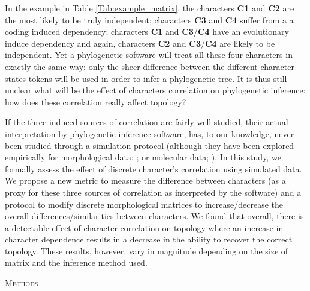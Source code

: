 \documentclass[12pt,letterpaper]{article}
\renewcommand{\section}[1]{%
\bigskip
\begin{center}
\begin{Large}
\normalfont\scshape #1
\medskip
\end{Large}
\end{center}}
\begin{document}
In the example in Table \ref{Tab:example_matrix}, the characters \textbf{C1} and \textbf{C2} are the most likely to be truly independent; characters \textbf{C3} and \textbf{C4} suffer from a a coding induced dependency; characters \textbf{C1} and \textbf{C3}/\textbf{C4} have an evolutionary induce dependency and again, characters \textbf{C2} and \textbf{C3}/\textbf{C4} are likely to be independent.
Yet a phylogenetic software will treat all these four characters in exactly the same way: only the sheer difference between the different character states tokens will be used in order to infer a phylogenetic tree.
It is thus still unclear what will be the effect of characters correlation on phylogenetic inference: how does these correlation really affect topology?

If the three induced sources of correlation are fairly well studied, their actual interpretation by phylogenetic inference software, has, to our knowledge, never been studied through a simulation protocol (although they have been explored empirically for morphological data; \citealt{Davalos01072014}; or molecular data; \citealt{ZouConvergence}).
In this study, we formally assess the effect of discrete character's correlation using simulated data.
We propose a new metric to measure the difference between characters (as a proxy for these three sources of correlation as interpreted by the software) and a protocol to modify discrete morphological matrices to increase/decrease the overall differences/similarities between characters.
We found that overall, there is a detectable effect of character correlation on topology where an increase in character dependence results in a decrease in the ability to recover the correct topology.
These results, however, vary in magnitude depending on the size of matrix and the inference method used.

\section{Methods}
\end{document}
